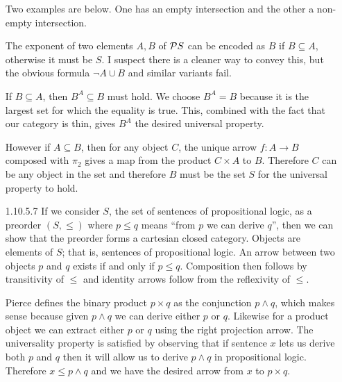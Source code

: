 \documentclass{article}
\begin{document}
\begin{enumerate}
  Two examples are below.
  One has an empty intersection and the other a non-empty intersection.
  \begin{center}
  \end{center}

  The exponent of two elements $A,B$ of $\mathcal{P}{S}$ can be encoded as $B$ if $B \subseteq A$, otherwise it must be $S$.
  I suspect there is a cleaner way to convey this, but the obvious formula $\neg A \cup B$ and similar variants fail.
  
  If $B \subseteq A$, then $B^A \subseteq B$ must hold.
  We choose $B^A = B$ because it is the largest set for which the equality is true.
  This, combined with the fact that our category is thin, gives $B^A$ the desired universal property.
  
  However if $A \subseteq B$, then for any object $C$, the unique arrow $f : A \rightarrow B$ composed with $\pi_2$ gives a map from the product $C \times A$ to $B$.
  Therefore $C$ can be any object in the set and therefore $B$ must be the set $S$ for the universal property to hold.

\vfill{}
\item [1.10.5.7]
  If we consider $S$, the set of sentences of propositional logic, as a preorder $(S, \le)$ where $p \le q$ means ``from $p$ we can derive $q$'', then we can show that the preorder forms a cartesian closed category.
  Objects are elements of $S$; that is, sentences of propositional logic.
  An arrow between two objects $p$ and $q$ exists if and only if $p \le q$.
  Composition then follows by transitivity of $\le$ and identity arrows follow from the reflexivity of $\le$.

  Pierce defines the binary product $p \times q$ as the conjunction $p \wedge q$, which makes sense because given $p \wedge q$ we can derive either $p$ or $q$.
  Likewise for a product object we can extract either $p$ or $q$ using the right projection arrow.
  The universality property is satisfied by observing that if sentence $x$ lets us derive both $p$ and $q$ then it will allow us to derive $p \wedge q$ in propositional logic.
  Therefore $x \le p \wedge q$ and we have the desired arrow from $x$ to $p \times q$.


\end{enumerate}
\end{document}
